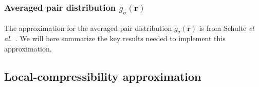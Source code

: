 \documentclass[letterpaper,twocolumn,amsmath,amssymb,pre,aps,10pt]{revtex4-1}
\newcommand\rr{\mathbf{r}}
\begin{document}
\subsubsection{Averaged pair distribution  $g_\sigma(\rr)$}

The approximation for the averaged pair distribution $g_\sigma(\rr)$
is from Schulte \emph{et al.}~\cite{schulte2012using}.  We will here
summarize the key results needed to implement this approximation.



\subsection{Local-compressibility approximation}
\end{document}
